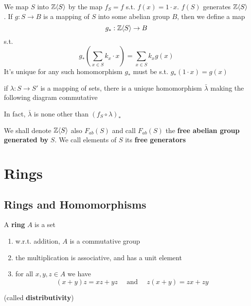 \documentclass[11pt]{article}
\begin{document}
We map \(S\) into \(\mathbb{Z}\langle S\rangle\) by the map \(f_S=f\) s.t. \(f(x)=1\cdot x\). \(f(S)\)
generates \(\mathbb{Z}\langle S\rangle\). If \(g:S\to B\) is a mapping of \(S\) into some abelian group \(B\), then
we define a map
\begin{equation*}
g_*:\mathbb{Z}\langle S\rangle\to B
\end{equation*}
s.t.
\begin{equation*}
g_*\left( \sum_{x\in S}k_x\cdot x \right)=\sum_{x\in S}k_xg(x)
\end{equation*}
It's unique for any such homomorphism \(g_*\) must be s.t. \(g_*(1\cdot x)=g(x)\)
\begin{proposition}[]
if \(\lambda:S\to S'\) is a mapping of sets, there is a unique homomorphism \(\bar{\lambda}\) making the
following diagram commutative
\begin{center}\end{center}
In fact, \(\bar{\lambda}\) is none other than \((f_S\circ\lambda)_*\)
\end{proposition}

We shall denote \(\mathbb{Z}\langle S\rangle\) also \(F_{ab}(S)\) and call \(F_{ab}(S)\) the \textbf{free abelian group}
\textbf{generated by} \(S\). We call elements of \(S\) its \textbf{free generators}


\section{Rings}
\label{sec:org2cd32d8}
\subsection{Rings and Homomorphisms}
\label{sec:org7a4f86f}
A \textbf{ring} \(A\) is a set
\begin{enumerate}
\item w.r.t. addition, \(A\) is a commutative group
\item the multiplication is associative, and has a unit element
\item for all \(x,y,z\in A\) we have
\begin{equation*}
(x+y)z=xz+yz \quad\text{ and }\quad z(x+y)=zx+zy
\end{equation*}
\end{enumerate}
(called \textbf{distributivity})
\end{document}
